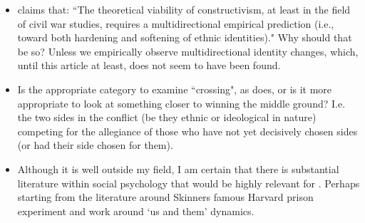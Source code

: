 \documentclass[12pt]{article}
\begin{document}
\begin{itemize}

	\item \citet{Kalyvas_2008} claims that: ``The theoretical viability of
		constructivism, at least in the field of civil war studies,
		requires a multidirectional empirical prediction (i.e., toward
		both hardening and softening of ethnic identities)." Why should
		that be so? Unless we empirically observe multidirectional
		identity changes, which, until this article at least, does
		not seem to have been found.

	\item Is the appropriate category to examine ``crossing", as
		\citet{Kalyvas_2008} does, or is it more appropriate to look at
		something closer to winning the middle ground? I.e. the two
		sides in the conflict (be they ethnic or ideological in nature)
		competing for the allegiance of those who have not yet
		decisively chosen sides (or had their side chosen for them). 
	
	\item Although it is well outside my field, I am certain that there is
		substantial literature within social psychology that would be
		highly relevant for \citet{Checkel_2017}. Perhaps starting from
		the literature around Skinners famous Harvard prison experiment
		and work around `us and them' dynamics.

\end{itemize}

\pagebreak



\end{document}
